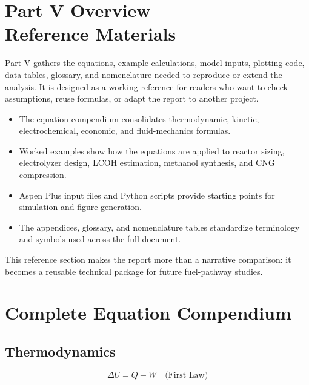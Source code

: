 \documentclass[12pt,twoside,openany]{book}
\let\cleardoublepage\clearpage
\begin{document}
\cleardoublepage
{}
\chapter*{Part V Overview\\Reference Materials}

Part V gathers the equations, example calculations, model inputs, plotting code, data tables, glossary, and nomenclature needed to reproduce or extend the analysis. It is designed as a working reference for readers who want to check assumptions, reuse formulas, or adapt the report to another project.

\begin{itemize}
    \item The equation compendium consolidates thermodynamic, kinetic, electrochemical, economic, and fluid-mechanics formulas.
    \item Worked examples show how the equations are applied to reactor sizing, electrolyzer design, LCOH estimation, methanol synthesis, and CNG compression.
    \item Aspen Plus input files and Python scripts provide starting points for simulation and figure generation.
    \item The appendices, glossary, and nomenclature tables standardize terminology and symbols used across the full document.
\end{itemize}

This reference section makes the report more than a narrative comparison: it becomes a reusable technical package for future fuel-pathway studies.


\chapter{Complete Equation Compendium}

\section{Thermodynamics}

\begin{dmath}
\boxed{\Delta U = Q - W} \quad \text{(First Law)}
\end{dmath}
\end{document}

